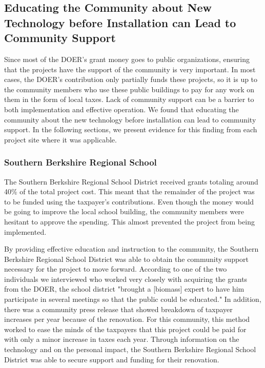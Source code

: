 \subsection{Educating the Community about New Technology before Installation can Lead to Community Support}
\par Since most of the DOER's grant money goes to public organizations, ensuring that the projects have the support of the community is very important. In most cases, the DOER's contribution only partially funds these projects, so it is up to the community members who use these public buildings to pay for any work on them in the form of local taxes. Lack of community support can be a barrier to both implementation and effective operation. We found that educating the community about the new technology before installation can lead to community support. In the following sections, we present evidence for this finding from each project site where it was applicable.

\subsubsection{Southern Berkshire Regional School}
\par The Southern Berkshire Regional School District received grants totaling around 40\% of the total project cost. This meant that the remainder of the project was to be funded using the taxpayer's contributions. Even though the money would be going to improve the local school building, the community members were hesitant to approve the spending. This almost prevented the project from being implemented.
\par By providing effective education and instruction to the community, the Southern Berkshire Regional School District was able to obtain the community support necessary for the project to move forward. According to one of the two individuals we interviewed who worked very closely with acquiring the grants from the DOER, the school district "brought a [biomass] expert to have him participate in several meetings so that the public could be educated." In addition, there was a community press release that showed breakdown of taxpayer increases per year because of the renovation. For this community, this method worked to ease the minds of the taxpayers that this project could be paid for with only a minor increase in taxes each year. Through information on the technology and on the personal impact, the Southern Berkshire Regional School District was able to secure support and funding for their renovation.

